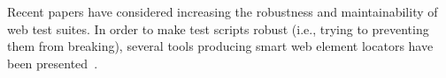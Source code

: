 Recent papers have considered increasing the robustness and maintainability of web test suites. 
In order to make test scripts robust (i.e., trying to preventing them from breaking), several tools producing smart web element locators have been presented~\cite{2016-Leotta-JSEP,kartik:ase15,2015-leotta-ICST,Yandrapally:2014:RTA:2610384.2610390}.

%

